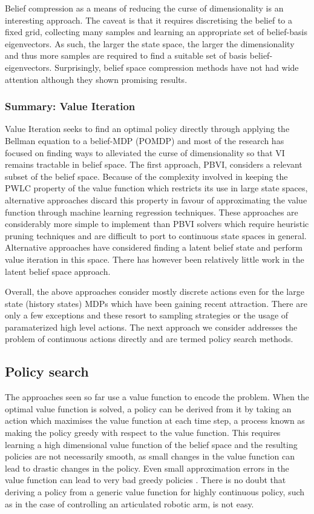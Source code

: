 Belief compression as a means of reducing the curse of dimensionality is an interesting approach. The 
caveat is that it requires discretising the belief to a fixed grid, collecting many samples and learning an 
appropriate set of belief-basis eigenvectors. As such, the larger the state space, the larger the dimensionality and thus more
samples are required to find a suitable set of basis belief-eigenvectors. Surprisingly, belief space compression 
methods have not had wide attention although they shown promising results.


\subsubsection{Summary: Value Iteration}

Value Iteration seeks to find an optimal policy directly through applying the Bellman equation to a belief-MDP (POMDP)
and most of the research has focused on finding ways to alleviated the curse of dimensionality so that VI remains tractable 
in belief space. The first approach, PBVI, considers a relevant subset of the belief space. Because 
of the complexity involved in keeping the PWLC property of the value function which restricts its use in large state 
spaces, alternative approaches discard this property in favour of approximating the value function through machine learning
regression techniques. These approaches are considerably more simple to implement than PBVI solvers which require heuristic pruning 
techniques and are difficult to port to continuous state spaces in general. Alternative approaches have considered finding a latent
belief state and perform value iteration in this space. There has however been relatively little work in the latent belief space approach.

Overall, the above approaches consider mostly discrete actions even for the large state (history states) MDPs
which have been gaining recent attraction. There are only a few exceptions and these resort to sampling strategies 
or the usage of paramaterized high level actions. The next approach we consider addresses the problem of continuous
actions directly and are termed policy search methods.

\subsection{Policy search}\label{lit:policy_search}

The approaches seen so far use a value function to encode the problem. When the optimal value function is solved, a policy can be derived from it by taking an action which maximises the value function at each time step, a process known as making the policy greedy with respect to the value function. This requires learning a high dimensional value function of the belief space and the resulting policies are not necessarily 
smooth, as small changes in the value function can lead to drastic changes in the policy. Even small 
approximation errors in the value function can lead to very bad greedy policies \cite{gpomdp_2000}. 
There is no doubt that deriving a policy from a generic value function for highly continuous policy, such as in the case 
of controlling an articulated robotic arm, is not easy. 


